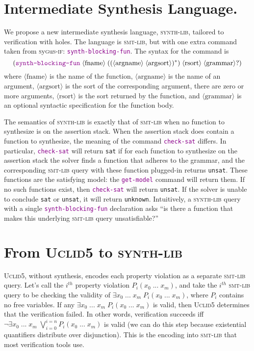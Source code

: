 \documentclass[acmsmall]{acmart}
\newcommand{\uclid}{{\textsc{Uclid5}}\xspace}
\newcommand{\smtlib}{{\textsc{smt-lib}}\xspace}
\newcommand{\sygusif}{{\textsc{s}y\textsc{g}u\textsc{s-if}}\xspace}
\newcommand{\llamalib}{{\textsc{synth-lib}}\xspace}
\newcommand{\keyword}[1]{\textcolor{darkmagenta}{\texttt{#1}}}
\newcommand{\codelike}[1]{\texttt{#1}}
\begin{document}
\section{Intermediate Synthesis Language.} We propose a new intermediate
synthesis language, \llamalib, tailored to verification with holes. The language
is \smtlib, but with one extra command taken from \sygusif:
\keyword{synth-blocking-fun}. The syntax for the command is
$$(\text{\keyword{synth-blocking-fun}} \; \langle \text{fname} \rangle \; ((
\langle \text{argname} \rangle \; \langle \text{argsort} \rangle )^* ) \;
\langle \text{rsort} \rangle \; \langle \text{grammar}\rangle?)$$ where
$\langle \text{fname} \rangle$ is the name of the function, $\langle
\text{argname} \rangle$ is the name of an argument, $\langle \text{argsort}
\rangle$ is the sort of the corresponding argument, there are zero or more
arguments, $\langle \text{rsort} \rangle$ is the sort returned by the function,
and $\langle \text{grammar} \rangle$ is an optional syntactic specification for
the function body.

The semantics of \llamalib is exactly that of \smtlib when no function to
synthesize is on the assertion stack. When the assertion stack does contain a
function to synthesize, the meaning of the command \keyword{check-sat} differs.
In particular, \keyword{check-sat} will return \codelike{sat} if for each
function to synthesize on the assertion stack the solver finds a function that
adheres to the grammar, and the corresponding \smtlib query with these function
plugged-in returns \codelike{unsat}. These functions are the satisfying model:
the \keyword{get-model} command will return them. If no such functions exist,
then \keyword{check-sat} will return \codelike{unsat}. If the solver is unable
to conclude \codelike{sat} or \codelike{unsat}, it will return
\codelike{unknown}. Intuitively, a \llamalib query with a single
\keyword{synth-blocking-fun} declaration asks ``is there a function that makes
this underlying \smtlib query unsatisfiable?''

\section{From \uclid to \llamalib} \uclid, without synthesis, encodes each
property violation as a separate \smtlib query. Let's call the $i^{th}$
property violation $P_i(x_{0}\;...\; x_{m})$, and take the $i^{th}$ \smtlib
query to be checking the validity of $\exists x_{0}\;...\; x_{m} \;
P_i(x_{0}\;...\; x_{m})$, where $P_i$ contains no free variables. If any
$\exists x_{0}\;...\; x_{m} \; P_i(x_{0}\;...\; x_{m})$ is valid, then \uclid
determines that the verification failed. In other words, verification succeeds
iff $\neg \exists x_{0}\;...\; x_{m}\; \bigvee_{i=0}^{i=n} P_i(x_{0}\;...\;
x_{m})$ is valid (we can do this step because existential quantifiers
distribute over disjunction). This is the encoding into \smtlib that most
verification tools use.
\end{document}
